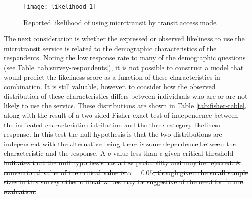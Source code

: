 \documentclass[smartcities,article,submit,moreauthors,pdftex]{Definitions/mdpi}
\providecommand{\DIFdel}[1]{{\protect\color{red}\sout{#1}}}                      %
\providecommand{\DIFdelbegin}{} %
\providecommand{\DIFdelend}{} %
\begin{document}
\begin{figure}
\texttt{[image: likelihood-1]} \caption{Reported likelihood of using microtransit by transit access mode.}\label{fig:likelihood}
\end{figure}

The next consideration is whether the expressed or observed likeliness to use the microtransit service is related to the demographic characteristics of the respondents. Noting the low response rate to many of the demographic questions (see Table \ref{tab:survey-respondents}), it is not possible to construct a model that would predict the likeliness score as a function of these characteristics in combination. It is still valuable, however, to consider how the observed distribution of these characteristics differs between individuals who are or are not likely to use the service. These distributions are shown in Table \ref{tab:fisher-table}, along with the result of a two-sided Fisher exact test of independence between the indicated characteristic distribution and the three-category likeliness response.
\DIFdelbegin \DIFdel{In this test the null hypothesis is that the two distributions are independent with the alternative being there is some dependence between the characteristic and the response. A \(p\)-value less than a given critical threshold indicates that the null hypothesis has a low probability and may be rejected. A conventional value of the critical value is \(\alpha=0.05\), though given the small sample sizes in this survey other critical values may be suggestive of the need for future evaluation.
}\DIFdelend
\end{document}
